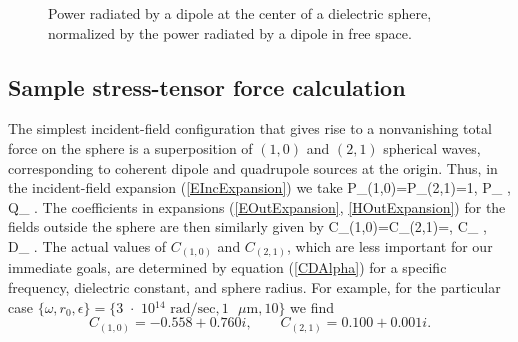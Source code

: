 \documentclass[letterpaper]{article}
\begin{document}
\begin{figure}[H]
\begin{center}
\caption{Power radiated by a dipole at the center of a dielectric
sphere, normalized by the power radiated by a dipole in free space.}
\end{center}
\end{figure}

\subsection{Sample stress-tensor force calculation}

The simplest incident-field configuration that gives rise to a
nonvanishing total force on the sphere is a superposition of 
$(1,0)$ and $(2,1)$ spherical waves, corresponding to coherent
dipole and quadrupole sources at the origin. Thus, in the
incident-field expansion (\ref{EIncExpansion}) we take
{
 P_{(1,0)}=P_{(2,1)}=1,
 \qquad 
 P_ \alpha, 
 \qquad 
 Q_ \alpha.
}
The coefficients in expansions (\ref{EOutExpansion}, 
\ref{HOutExpansion}) for the fields outside the sphere 
are then similarly given by 
{
 C_{(1,0)}=C_{(2,1)}=,
 \qquad 
 C_ \alpha, 
 \qquad 
 D_ \alpha.
}
The actual values of $C_{(1,0)}$ and $C_{(2,1)}$, which
are less important for our immediate goals, are determined
by equation (\ref{CDAlpha}) for a specific frequency,
dielectric constant, and sphere radius. For example, 
for the particular case 
$\{ \omega, r_0, \epsilon\}
 =
 \{ \text{3 $\cdot$ 10$^{14}$ rad/sec},
    1\text{ $\mu$m},
    10
\}$
we find
$$ C_{(1,0)}=-0.558 + 0.760i, \qquad
   C_{(2,1)}= 0.100 + 0.001i.
$$
\end{document}
